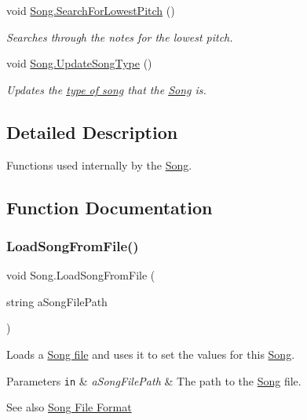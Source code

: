\begin{DoxyCompactItemize}
void \hyperlink{group___song_priv_func_gac2e812c6385529eb7a9be5082c7bde75}{Song.\+Search\+For\+Lowest\+Pitch} ()
\begin{DoxyCompactList}\small\item\em Searches through the notes for the lowest pitch. \end{DoxyCompactList}\item 
void \hyperlink{group___song_priv_func_ga9a1d6eba1576c3631d3c0331196d9ae2}{Song.\+Update\+Song\+Type} ()
\begin{DoxyCompactList}\small\item\em Updates the \hyperlink{group___song_enums_gae681a1f001333e39fc1cb4fea97bfe1b}{type of song} that the \hyperlink{class_song}{Song} is. \end{DoxyCompactList}\end{DoxyCompactItemize}


\subsection{Detailed Description}
Functions used internally by the \hyperlink{class_song}{Song}. 

\subsection{Function Documentation}
\mbox{\label{group___song_priv_func_ga5c8edd8f7ebeab0d93f5619a644c30f5}} 
\subsubsection{\texorpdfstring{Load\+Song\+From\+File()}{LoadSongFromFile()}}
{\footnotesize\ttfamily void Song.\+Load\+Song\+From\+File (\begin{DoxyParamCaption}\item[{string}]{a\+Song\+File\+Path }\end{DoxyParamCaption})\hspace{0.3cm}{\ttfamily [private]}}



Loads a \hyperlink{group___song_group_DocSongFileFormat}{Song file} and uses it to set the values for this \hyperlink{class_song}{Song}. 


\begin{DoxyParams}[1]{Parameters}
\mbox{\tt in}  & {\em a\+Song\+File\+Path} & The path to the \hyperlink{class_song}{Song} file. \\
\hline
\end{DoxyParams}
\begin{DoxySeeAlso}{See also}
\hyperlink{group___song_group_DocSongFileFormat}{Song File Format} 
\end{DoxySeeAlso}


